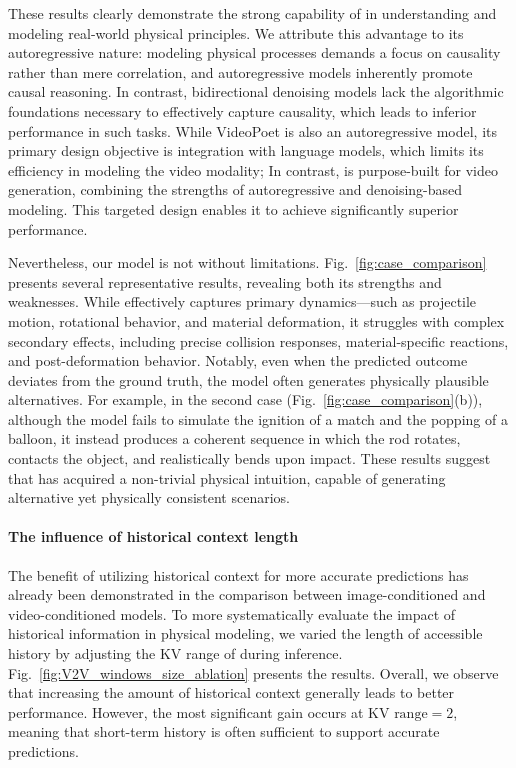 These results clearly demonstrate the strong capability of \magi in understanding and modeling real-world physical principles. We attribute this advantage to its autoregressive nature: modeling physical processes demands a focus on causality rather than mere correlation, and autoregressive models inherently promote causal reasoning. In contrast, bidirectional denoising models lack the algorithmic foundations necessary to effectively capture causality, which leads to inferior performance in such tasks.
While VideoPoet is also an autoregressive model, its primary design objective is integration with language models, which limits its efficiency in modeling the video modality; In contrast, \magi is purpose-built for video generation, combining the strengths of autoregressive and denoising-based modeling. This targeted design enables it to achieve significantly superior performance.


Nevertheless, our model is not without limitations. Fig.~\ref{fig:case_comparison} presents several representative results, revealing both its strengths and weaknesses. While \magi effectively captures primary dynamics—such as projectile motion, rotational behavior, and material deformation, it struggles with complex secondary effects, including precise collision responses, material-specific reactions, and post-deformation behavior. Notably, even when the predicted outcome deviates from the ground truth, the model often generates physically plausible alternatives. For example, in the second case (Fig.~\ref{fig:case_comparison}(b)), although the model fails to simulate the ignition of a match and the popping of a balloon, it instead produces a coherent sequence in which the rod rotates, contacts the object, and realistically bends upon impact. These results suggest that \magi has acquired a non-trivial physical intuition, capable of generating alternative yet physically consistent scenarios.





\paragraph{The influence of historical context length}
The benefit of utilizing historical context for more accurate predictions has already been demonstrated in the comparison between image-conditioned and video-conditioned \magi models. To more systematically evaluate the impact of historical information in physical modeling, we varied the length of accessible history by adjusting the KV range of \magi during inference. Fig.~\ref{fig:V2V_windows_size_ablation} presents the results. Overall, we observe that increasing the amount of historical context generally leads to better performance. However, the most significant gain occurs at $\text{KV range}=2$, meaning that short-term history is often sufficient to support accurate predictions.


